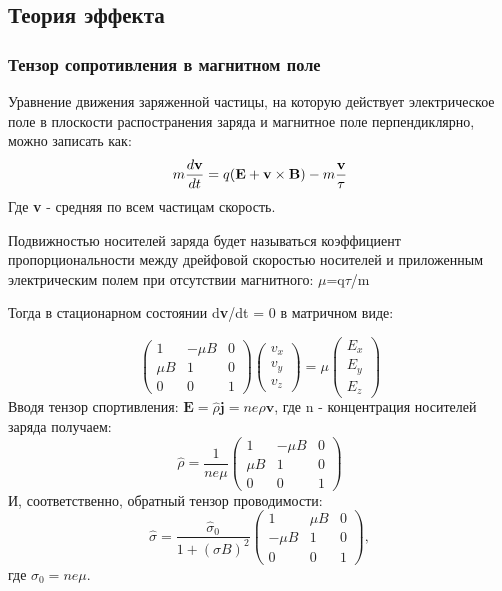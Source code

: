 \subsection{Теория эффекта}
\subsubsection{Тензор сопротивления в магнитном поле}
Уравнение движения заряженной частицы, на которую действует электрическое поле в плоскости распостранения заряда и магнитное поле перпендиклярно, можно записать как:
\begin{equation}
	 m\frac{d\textbf{v}}{dt}=q(\textbf{E}+\textbf{v}\times\textbf{B})-m\frac{\textbf{v}}{\tau} \\
\end{equation}
Где \textbf{v} - средняя по всем частицам скорость. 

Подвижностью носителей заряда будет называться коэффициент пропорциональности между дрейфовой скоростью носителей и приложенным электрическим полем при отсутствии магнитного: $\mu$=q$\tau$/m

Тогда в стационарном состоянии d\textbf{v}/dt = 0 в матричном виде:

\begin{equation}
\left(\begin{array}{ccc}
1 & -\mu B & 0 \\
\mu B & 1 & 0 \\
0 & 0 & 1
\end{array}\right)\left(\begin{array}{l}
v_{x} \\
v_{y} \\
v_{z}
\end{array}\right)=\mu\left(\begin{array}{l}
E_{x} \\
E_{y} \\
E_{z}
\end{array}\right)
\end{equation}
Вводя тензор спортивления: $\textbf{E}=\hat{\rho} \textbf{j} = ne \hat{\rho}\textbf{v}$, где n - концентрация носителей заряда получаем:
\begin{equation}
\hat{\rho}=\frac{1}{n e \mu}\left(\begin{array}{ccc}
1 & -\mu B & 0 \\
\mu B & 1 & 0 \\
0 & 0 & 1
\end{array}\right)
\end{equation}
И, соответственно, обратный тензор проводимости:
\begin{equation}
\hat{\sigma}=\frac{\hat{\sigma}_{0}}{1+(\sigma B)^{2}}\left(\begin{array}{ccc}
1 & \mu B & 0 \\
-\mu B & 1 & 0 \\
0 & 0 & 1
\end{array}\right),
\end{equation}
где $\sigma_0=ne\mu$.

